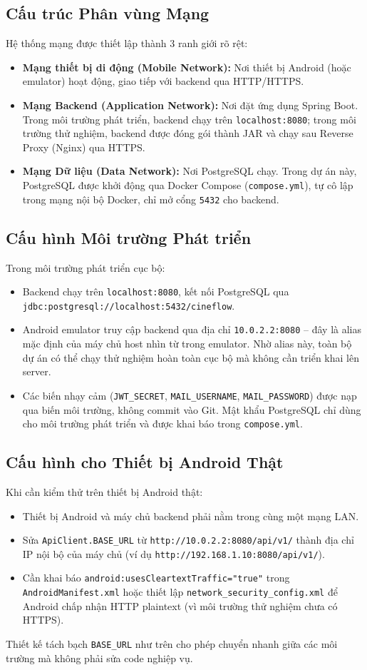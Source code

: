 \subsection{Cấu trúc Phân vùng Mạng}
Hệ thống mạng được thiết lập thành 3 ranh giới rõ rệt:
\begin{itemize}
  \item \textbf{Mạng thiết bị di động (Mobile Network):} Nơi thiết bị Android (hoặc
  emulator) hoạt động, giao tiếp với backend qua HTTP/HTTPS.
  \item \textbf{Mạng Backend (Application Network):} Nơi đặt ứng dụng Spring Boot.
  Trong môi trường phát triển, backend chạy trên \texttt{localhost:8080}; trong môi
  trường thử nghiệm, backend được đóng gói thành JAR và chạy sau Reverse Proxy
  (Nginx) qua HTTPS.
  \item \textbf{Mạng Dữ liệu (Data Network):} Nơi PostgreSQL chạy. Trong dự án này,
  PostgreSQL được khởi động qua Docker Compose (\texttt{compose.yml}), tự cô lập
  trong mạng nội bộ Docker, chỉ mở cổng \texttt{5432} cho backend.
\end{itemize}

\subsection{Cấu hình Môi trường Phát triển}
Trong môi trường phát triển cục bộ:
\begin{itemize}
  \item Backend chạy trên \texttt{localhost:8080}, kết nối PostgreSQL qua
  \texttt{jdbc:postgresql://localhost:5432/cineflow}.
  \item Android emulator truy cập backend qua địa chỉ \texttt{10.0.2.2:8080} --
  đây là alias mặc định của máy chủ host nhìn từ trong emulator. Nhờ alias này,
  toàn bộ dự án có thể chạy thử nghiệm hoàn toàn cục bộ mà không cần triển khai
  lên server.
  \item Các biến nhạy cảm (\texttt{JWT\_SECRET}, \texttt{MAIL\_USERNAME},
  \texttt{MAIL\_PASSWORD}) được nạp qua biến môi trường, không commit vào Git.
  Mật khẩu PostgreSQL chỉ dùng cho môi trường phát triển và được khai báo trong
  \texttt{compose.yml}.
\end{itemize}

\subsection{Cấu hình cho Thiết bị Android Thật}
Khi cần kiểm thử trên thiết bị Android thật:
\begin{itemize}
  \item Thiết bị Android và máy chủ backend phải nằm trong cùng một mạng LAN.
  \item Sửa \texttt{ApiClient.BASE\_URL} từ \texttt{http://10.0.2.2:8080/api/v1/}
  thành địa chỉ IP nội bộ của máy chủ (ví dụ \texttt{http://192.168.1.10:8080/api/v1/}).
  \item Cần khai báo \texttt{android:usesCleartextTraffic="true"} trong
  \texttt{AndroidManifest.xml} hoặc thiết lập \texttt{network\_security\_config.xml}
  để Android chấp nhận HTTP plaintext (vì môi trường thử nghiệm chưa có HTTPS).
\end{itemize}

Thiết kế tách bạch \texttt{BASE\_URL} như trên cho phép chuyển nhanh giữa các môi
trường mà không phải sửa code nghiệp vụ.
